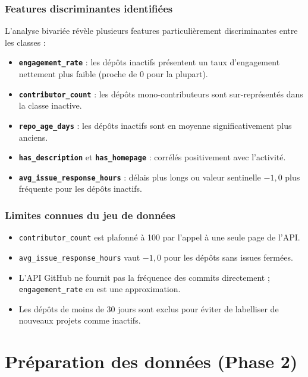 \documentclass[12pt,a4paper]{article}
\begin{document}
\subsubsection{Features discriminantes identifiées}

L'analyse bivariée révèle plusieurs features particulièrement discriminantes entre les classes :

\begin{itemize}
  \item \textbf{\texttt{engagement\_rate}} : les dépôts inactifs présentent un taux d'engagement
    nettement plus faible (proche de 0 pour la plupart).
  \item \textbf{\texttt{contributor\_count}} : les dépôts mono-contributeurs sont sur-représentés
    dans la classe inactive.
  \item \textbf{\texttt{repo\_age\_days}} : les dépôts inactifs sont en moyenne significativement
    plus anciens.
  \item \textbf{\texttt{has\_description}} et \textbf{\texttt{has\_homepage}} : corrélés
    positivement avec l'activité.
  \item \textbf{\texttt{avg\_issue\_response\_hours}} : délais plus longs ou valeur sentinelle
    $-1{,}0$ plus fréquente pour les dépôts inactifs.
\end{itemize}

\subsubsection{Limites connues du jeu de données}

\begin{itemize}[noitemsep]
  \item \texttt{contributor\_count} est plafonné à 100 par l'appel à une seule page de l'API.
  \item \texttt{avg\_issue\_response\_hours} vaut $-1{,}0$ pour les dépôts sans issues fermées.
  \item L'API GitHub ne fournit pas la fréquence des commits directement ; \texttt{engagement\_rate}
    en est une approximation.
  \item Les dépôts de moins de 30 jours sont exclus pour éviter de labelliser de nouveaux projets
    comme inactifs.
\end{itemize}

\newpage
\section{Préparation des données (Phase 2)}
\end{document}
